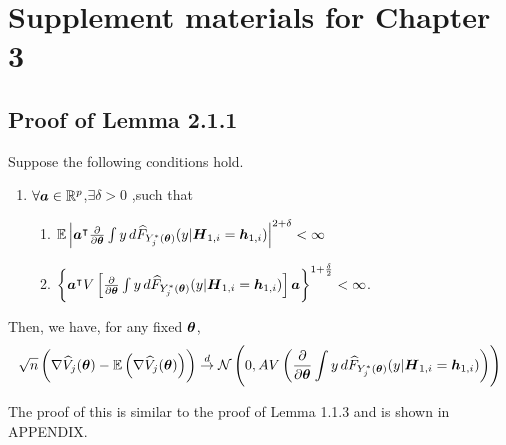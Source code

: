 \chapter{Supplement materials for Chapter 3}
\section{Proof of Lemma 2.1.1}
\begin{lemma}
 Suppose the following conditions hold.
	\begin{enumerate}
		\item $\forall \boldsymbol{a} \in \mathbb{R}^p$,$\exists \delta > 0$ ,such that
		\begin{enumerate}
			\item $\mathbb{E}\lt|\bs{a}^\itl\pard[\bs{\theta}] \int y \,d  \wh{F}_{Y_j^*(\bs{\theta})}(y | \bs{H}_{1,i} = \bs{h}_{1,i})\rt|^{2+\delta} < \infty$
			\item $ \lt\{\bs{\bs{a}^{\intercal}}V\lt[\pard[\bs{\theta}] \int y \,d  \wh{F}_{Y_j^*(\bs{\theta})}(y | \bs{H}_{1,i} = \bs{h}_{1,i})\rt]\bs{a} \rt\}^{1+\frac{\delta}{2}}< \infty$.
		\end{enumerate}
	\end{enumerate}
	Then, we have, for any fixed $\boldsymbol{\theta}$,
	\begin{gather}
	\begin{flalign*}
	\sqrt{n}\lt(\nabla \wh{V}_j(\bs{\theta})  -\mathbb{E}\lt(\nabla \wh{V}_j(\bs{\theta})\rt)\rt)\overset{d}{\to}\mathcal{N}\lt(0,AV\lt(\pard[\bs{\theta}] \int y \,d  \wh{F}_{Y_j^*(\bs{\theta})}(y | \bs{H}_{1,i} = \bs{h}_{1,i}) \rt)\rt)
	\end{flalign*}
	\end{gather}
\end{lemma}

The proof of this is similar to the proof of Lemma 1.1.3 and is shown in APPENDIX.

%
%

